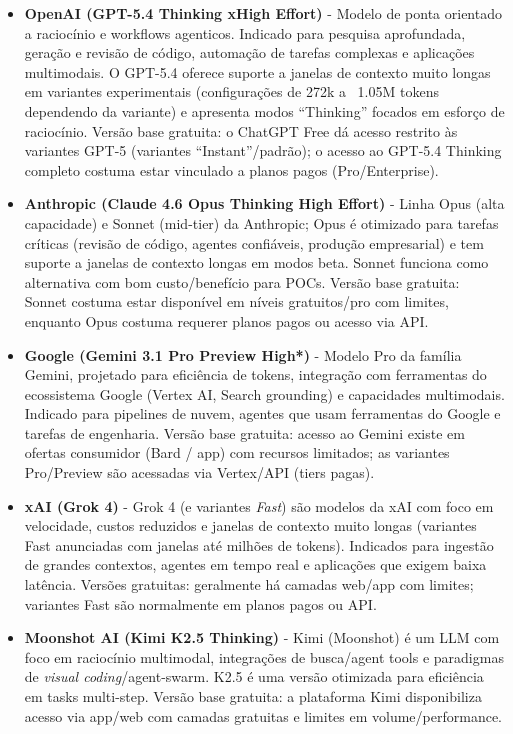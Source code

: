 \documentclass[12pt]{article}
\begin{document}
\begin{itemize}
    \item \textbf{OpenAI (GPT-5.4 Thinking xHigh Effort)} - Modelo de ponta orientado a raciocínio e workflows agenticos. Indicado para pesquisa aprofundada, geração e revisão de código, automação de tarefas complexas e aplicações multimodais. O GPT-5.4 oferece suporte a janelas de contexto muito longas em variantes experimentais (configurações de 272k a ~1.05M tokens dependendo da variante) e apresenta modos ``Thinking'' focados em esforço de raciocínio. Versão base gratuita: o ChatGPT Free dá acesso restrito às variantes GPT-5 (variantes ``Instant''/padrão); o acesso ao GPT-5.4 Thinking completo costuma estar vinculado a planos pagos (Pro/Enterprise). 
    \item \textbf{Anthropic (Claude 4.6 Opus Thinking High Effort)} - Linha Opus (alta capacidade) e Sonnet (mid-tier) da Anthropic; Opus é otimizado para tarefas críticas (revisão de código, agentes confiáveis, produção empresarial) e tem suporte a janelas de contexto longas em modos beta. Sonnet funciona como alternativa com bom custo/benefício para POCs. Versão base gratuita: Sonnet costuma estar disponível em níveis gratuitos/pro com limites, enquanto Opus costuma requerer planos pagos ou acesso via API.
    \item \textbf{Google (Gemini 3.1 Pro Preview High*)} - Modelo Pro da família Gemini, projetado para eficiência de tokens, integração com ferramentas do ecossistema Google (Vertex AI, Search grounding) e capacidades multimodais. Indicado para pipelines de nuvem, agentes que usam ferramentas do Google e tarefas de engenharia. Versão base gratuita: acesso ao Gemini existe em ofertas consumidor (Bard / app) com recursos limitados; as variantes Pro/Preview são acessadas via Vertex/API (tiers pagas).
    \item \textbf{xAI (Grok 4)} - Grok 4 (e variantes \emph{Fast}) são modelos da xAI com foco em velocidade, custos reduzidos e janelas de contexto muito longas (variantes Fast anunciadas com janelas até milhões de tokens). Indicados para ingestão de grandes contextos, agentes em tempo real e aplicações que exigem baixa latência. Versões gratuitas: geralmente há camadas web/app com limites; variantes Fast são normalmente em planos pagos ou API.
    \item \textbf{Moonshot AI (Kimi K2.5 Thinking)} - Kimi (Moonshot) é um LLM com foco em raciocínio multimodal, integrações de busca/agent tools e paradigmas de \emph{visual coding}/agent-swarm. K2.5 é uma versão otimizada para eficiência em tasks multi-step. Versão base gratuita: a plataforma Kimi disponibiliza acesso via app/web com camadas gratuitas e limites em volume/performance.
\end{itemize}
\end{document}
